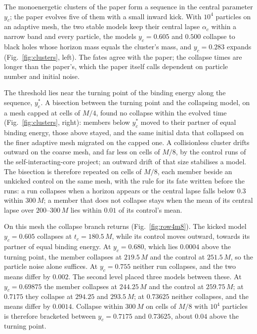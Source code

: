 \documentclass[aps,prd,twocolumn,superscriptaddress,nofootinbib,floatfix]{revtex4-2}
\begin{document}
The monoenergetic clusters of the paper form a sequence in the central parameter $y_c$;
the paper evolves five of them with a small inward kick. With $10^4$ particles on an
adaptive mesh, the two stable models keep their central lapse $\alpha_c$
within a narrow band and every particle, the models $y_c=0.605$ and $0.500$ collapse to
black holes whose horizon mass equals the cluster's mass, and $y_c=0.283$ expands
(Fig.~\ref{fig:clusters}, left). The fates agree with the paper; the collapse times are
longer than the paper's, which the paper itself calls dependent on particle number and
initial noise.

The threshold lies near the turning point of the binding energy along the sequence,
$y_c^\ast$. A bisection between the turning point and the collapsing model, on a mesh
capped at cells of $M/4$, found no collapse within the evolved time
(Fig.~\ref{fig:clusters}, right): members below $y_c^\ast$ moved to their partner of equal
binding energy, those above stayed, and the same initial data that collapsed on the finer
adaptive mesh migrated on the capped one. A collisionless cluster drifts outward on the
coarse mesh, and far less on cells of $M/8$, by the control runs of the
self-interacting-core project; an outward drift of that size stabilises a model. The
bisection is therefore repeated on cells of $M/8$, each member beside an unkicked control
on the same mesh, with the rule for its fate written before the runs: a run collapses
when a horizon appears or the central lapse falls below $0.3$ within $300\,M$; a member
that does not collapse stays when the mean of its central lapse over $200$--$300\,M$ lies
within $0.01$ of its control's mean.

On this mesh the collapse branch returns (Fig.~\ref{fig:row4m8}). The kicked model
$y_c=0.605$ collapses at $t_c=180.5\,M$, while its control moves outward, towards its
partner of equal binding energy. At $y_c=0.680$, which lies $0.0004$ above the turning
point, the member collapses at $219.5\,M$ and the control at $251.5\,M$, so the particle
noise alone suffices. At $y_c=0.755$ neither run collapses, and the two means differ by
$0.002$. The second level placed three models between these. At $y_c=0.69875$ the member
collapses at $244.25\,M$ and the control at $259.75\,M$; at $0.7175$ they collapse at
$294.25$ and $293.5\,M$; at $0.73625$ neither collapses, and the means differ by
$0.0014$. Collapse within $300\,M$ on cells of $M/8$ with $10^4$ particles is therefore
bracketed between $y_c=0.7175$ and $0.73625$, about $0.04$ above the turning point.
\end{document}

